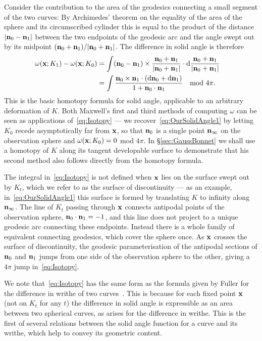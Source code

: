     Consider the contribution to the area of the geodesics connecting a small segment of the two curves: By Archimedes' theorem on the equality of the area of the sphere and its circumscribed cylinder this is equal to the product of the distance $|{\bf n}_0-{\bf n}_1|$ between the two endpoints of the geodesic arc and the angle swept out by its midpoint $({\bf n}_0+{\bf n}_1)/|{\bf n}_0+{\bf n}_1|$. The difference in solid angle is therefore 
    \begin{align}
        \omega({\bf x}; K_1) - \omega({\bf x}; K_0)
        &=
        \int ({\bf n}_0 - {\bf n}_1) \times \frac{{\bf n}_0 + {\bf n}_1}{|{\bf n}_0 + {\bf n}_1|} \cdot \mathrm{d} \frac{{\bf n}_0 + {\bf n}_1}{|{\bf n}_0 + {\bf n}_1|} \quad  \nonumber \\ 
        &=
        \int \frac{{\bf n}_0 \times {\bf n}_1 \cdot ( \mathrm{d}{\bf n}_0 + \mathrm{d}{\bf n}_1 )}{1+{\bf n}_0 \cdot {\bf n}_1} \quad \textrm{mod } 4\pi.
        \label{eq:Isotopy}
    \end{align}
    This is the basic homotopy formula for solid angle, applicable to an arbitrary deformation of $K$. Both Maxwell's first and third methods of computing $\omega$ can be seen as applications of~\eqref{eq:Isotopy} --- we recover~\eqref{eq:OurSolidAngle1} by letting $K_0$ recede asymptotically far from $\bf x$, so that ${\bf n}_0$ is a single point ${\bf n}_{\infty}$ on the observation sphere and $\omega({\bf x}; K_0)=0$ mod $4\pi$. In \S\ref{sec:GaussBonnet} we shall use a homotopy of $K$ along its tangent developable surface to demonstrate that his second method also follows directly from the homotopy formula. 

    The integral in~\eqref{eq:Isotopy} is not defined when $\bf x$ lies on the surface swept out by $K_t$, which we refer to as the surface of discontinuity --- as an example, in~\eqref{eq:OurSolidAngle1} this surface is formed by translating $K$ to infinity along ${\bf n}_\infty$. The line of $K_t$ passing through $\bf x$ connects antipodal points of the observation sphere, ${\bf n}_0 \cdot {\bf n}_1= -1$, and this line does not project to a unique geodesic arc connecting these endpoints. Instead there is a whole family of equivalent connecting geodesics, which cover the sphere once. As $\bf x$ crosses the surface of discontinuity, the geodesic parameterisation of the antipodal sections of ${\bf n}_0$ and ${\bf n}_1$ jumps from one side of the observation sphere to the other, giving a $4 \pi$ jump in~\eqref{eq:Isotopy}.

    We note that~\eqref{eq:Isotopy} has the same form as the formula given by Fuller for the difference in writhe of two curves~\citep{Fuller1978}. This is because for each fixed point ${\bf x}$ (not on $K_t$ for any $t$) the difference in solid angle is expressible as an area between two spherical curves, as arises for the difference in writhe. This is the first of several relations between the solid angle function for a curve and its writhe, which help to convey its geometric content.

